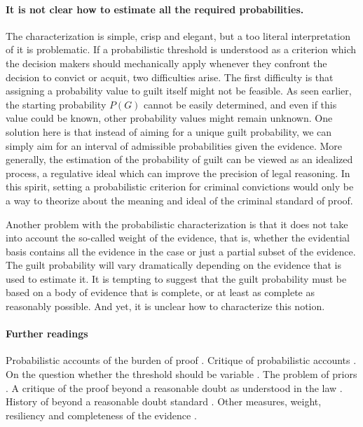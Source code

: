 \documentclass[10pt]{article}
\begin{document}

\paragraph{It is not clear how to estimate all the required probabilities.}

The characterization is simple, crisp and elegant, but a too literal interpretation of it is problematic.  If a probabilistic threshold is understood as a criterion which the decision makers 
 should mechanically apply whenever they confront the decision to convict or acquit, two difficulties arise. The first difficulty is that assigning a probability value to guilt itself might not be feasible. As seen earlier, the starting probability $P(G)$ cannot be easily determined, 
and even if this value could be known, other probability values might remain unknown. One solution here is that instead 
 of aiming for a unique guilt probability, we can simply aim for an interval of admissible probabilities given the evidence. 
 More generally, the estimation of the probability of guilt can be viewed as an idealized process, a regulative ideal which can improve the precision of legal reasoning. 
In this spirit, setting a probabilistic criterion for criminal convictions would only be a way 
to theorize about the meaning and ideal of the criminal standard of proof. 

Another problem with the probabilistic characterization 
is that it does not take into account the so-called weight of the evidence, that is, whether the evidential basis contains all the evidence 
in the case or just a partial subset of the evidence. The guilt probability will vary dramatically 
depending on the evidence that is used to estimate it. It is tempting to suggest that the guilt probability must be based on a body 
of evidence that is complete, or at least as complete as reasonably possible. And yet, it is unclear how to characterize this notion.

\paragraph{Further readings}

Probabilistic accounts of the burden of proof
\citep{kaplan1968, kaye1986, kaye1999, hamer2004, cheng2013}.
Critique of probabilistic accounts \citep{cohen1977, nesson79, thomson86, stein05, ho08, pardoAllen2008, haack2011}.
On the question whether the threshold should be variable \citep{kaplow2012, picinali2013}.
The problem of priors \citep{finkelsteinFairley1970, friedman2000}.
A critique of the proof beyond a reasonable doubt  
as understood in the law \citep{laudan2006}.
History of beyond a reasonable doubt standard 
\citep{shapiro1991, whitman2008}. Other measures, weight, resiliency and completeness 
of the evidence \citep{kaye1999, stein05}.
\end{document}
